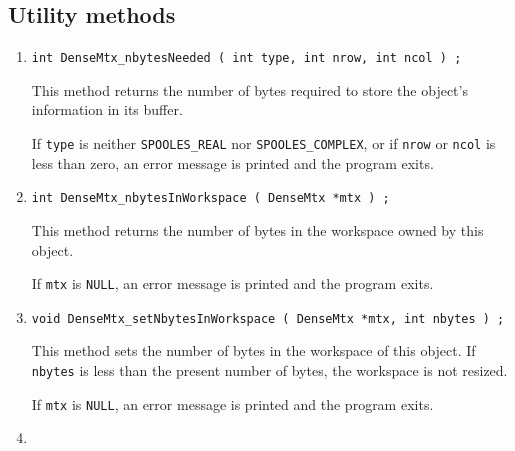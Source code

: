 \subsection{Utility methods}
\label{subsection:DenseMtx:proto:utility}
\par
\begin{enumerate}
\item
\begin{verbatim}
int DenseMtx_nbytesNeeded ( int type, int nrow, int ncol ) ;
\end{verbatim}
\par
This method returns the number of bytes required to store the
object's information in its buffer.
\par {}
If {\tt type} is neither {\tt SPOOLES\_REAL}
nor {\tt SPOOLES\_COMPLEX},
or if {\tt nrow} or {\tt ncol} is less than zero,
an error message is printed and the program exits.
\item
\begin{verbatim}
int DenseMtx_nbytesInWorkspace ( DenseMtx *mtx ) ;
\end{verbatim}
\par
This method returns the number of bytes in the workspace owned by
this object.
\par {}
If {\tt mtx} is {\tt NULL},
an error message is printed and the program exits.
\item
\begin{verbatim}
void DenseMtx_setNbytesInWorkspace ( DenseMtx *mtx, int nbytes ) ;
\end{verbatim}
\par
This method sets the number of bytes in the workspace of this object.
If {\tt nbytes} is less than the present number of bytes, 
the workspace is not resized.
\par {}
If {\tt mtx} is {\tt NULL},
an error message is printed and the program exits.
\item

\end{enumerate}
